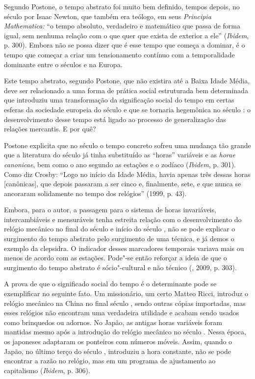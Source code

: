 Segundo Postone, o tempo abstrato foi muito bem definido, tempos depois,
no século  por Isaac Newton, que também era teólogo, em seus
\emph{Principia Mathematica:} ``o tempo absoluto, verdadeiro e
matemático que passa de forma igual, sem nenhuma relação com o que quer
que exista de exterior a ele'' (\emph{Ibidem}, p. 300). Embora não se
possa dizer que é esse tempo que começa a dominar, é o tempo que começar
a criar um tensionamento contínuo com a temporalidade dominante entre o
séculos  e  na Europa.

Este tempo abstrato, segundo Postone, que não existira até a Baixa Idade
Média, deve ser relacionado a uma forma de prática social estruturada
bem determinada que introduziu uma transformação da significação social
do tempo em certas esferas da sociedade europeia do século  e que se
tornaria hegemônica no século : o desenvolvimento desse tempo está
ligado ao processo de generalização das relações mercantis. E por quê?

Postone explicita que no século  o tempo concreto sofreu uma mudança
tão grande que a literatura do século  já tinha substituído as
``horas'' variáveis e as \emph{horae canonicae}, bem como o ano segundo
as estações e o zodíaco (\emph{Ibidem}, p. 301). Como diz Crosby:
``Logo no início da Idade Média, havia apenas três dessas horas
[canônicas], que depois passaram a ser cinco e, finalmente, sete, e
que nunca se ancoraram solidamente no tempo dos relógios'' (1999, p. 43).

Embora, para o autor, a passagem para o sistema de horas invariáveis,
intercambiáveis e mensuráveis tenha estreita relação com o
desenvolvimento do relógio mecânico no final do século  e início do
século , não se pode explicar o surgimento do tempo abstrato pelo
surgimento de uma técnica, e já demos o exemplo da clepsidra. O
indicador desses marcadores temporais variava mais ou menos de acordo
com as estações. Pode"-se então reforçar a ideia de que o surgimento do
tempo abstrato é sócio"-cultural e não técnico (, 2009, p. 303).

A prova de que o significado social do tempo é o determinante pode se
exemplificar no seguinte fato. Um missionário, um certo Matteo Ricci,
introduz o relógio mecânico na China no final século , sendo outras
cópias importadas, mas esses relógios não encontram uma verdadeira
utilidade e acabam sendo usados como brinquedos ou adornos. No Japão, as
antigas horas variáveis foram mantidas mesmo após a introdução do
relógio mecânico no século . Nessa época, os japoneses adaptaram os
ponteiros com números móveis. Assim, quando o Japão, no último terço do
século , introduziu a hora constante, não se pode encontrar a razão
no relógio, mas em um programa de ajustamento ao capitalismo
(\emph{Ibidem}, p. 306).

